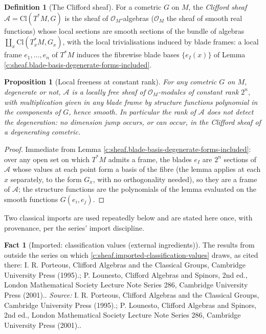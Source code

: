 \documentclass[11pt]{article}
\newtheorem{proposition}[theorem]{Proposition}
\theoremstyle{definition}
\newtheorem{definition}[theorem]{Definition}
\newtheorem{fact}[theorem]{Fact}
\theoremstyle{plain}
\providecommand{\Cl}{}\renewcommand{\Cl}{\mathrm{Cl}}
\providecommand{\shA}{}\renewcommand{\shA}{\mathcal{A}}
\begin{document}
\begin{definition}[The Clifford sheaf]\label{c:obj.sheaf.clifford-sheaf}
For a cometric $G$ on $M$, the \emph{Clifford sheaf} $\shA = \Cl(T^*M, G)$ is the sheaf of $\mathcal{O}_M$-algebras ($\mathcal{O}_M$ the sheaf of smooth real functions) whose local sections are smooth sections of the bundle of algebras $\coprod_{x} \Cl(T^*_xM, G_x)$, with the local trivialisations induced by blade frames: a local frame $e_1, \dots, e_n$ of $T^*M$ induces the fibrewise blade bases $\{e_I(x)\}$ of Lemma \ref{c:sheaf.blade-basis-degenerate-forms-included}.
\end{definition}

\begin{proposition}[Local freeness at constant rank]\label{c:sheaf.local-freeness-constant-rank}
For any cometric $G$ on $M$, degenerate or not, $\shA$ is a locally free sheaf of $\mathcal{O}_M$-modules of constant rank $2^n$, with multiplication given in any blade frame by structure functions polynomial in the components of $G$, hence smooth. In particular the rank of $\shA$ does not detect the degeneration: no dimension jump occurs, or can occur, in the Clifford sheaf of a degenerating cometric.
\end{proposition}
\begin{proof}
Immediate from Lemma \ref{c:sheaf.blade-basis-degenerate-forms-included}: over any open set on which $T^*M$ admits a frame, the blades $e_I$ are $2^n$ sections of $\shA$ whose values at each point form a basis of the fibre (the lemma applies at each $x$ separately, to the form $G_x$, with no orthogonality needed), so they are a frame of $\shA$; the structure functions are the polynomials of the lemma evaluated on the smooth functions $G(e_i, e_j)$.

\end{proof}

\label{c:note.sheaf.setting-clifford-algebras-degenerate-forms-2}
Two classical imports are used repeatedly below and are stated here once, with provenance, per the series' import discipline.

\begin{fact}[Imported: classification values (external ingredients)]\label{c:sheaf.imported-classification-values-external}
The results from outside the series on which \ref{c:sheaf.imported-classification-values} draws, as cited there: I. R. Porteous, Clifford Algebras and the Classical Groups, Cambridge University Press (1995).; P. Lounesto, Clifford Algebras and Spinors, 2nd ed., London Mathematical Society Lecture Note Series 286, Cambridge University Press (2001)..
\emph{Source:} I. R. Porteous, Clifford Algebras and the Classical Groups, Cambridge University Press (1995).; P. Lounesto, Clifford Algebras and Spinors, 2nd ed., London Mathematical Society Lecture Note Series 286, Cambridge University Press (2001)..
\end{fact}
\end{document}
